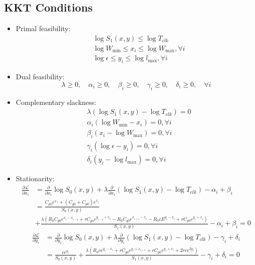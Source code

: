 \documentclass{article}
\begin{document}
\subsection{KKT Conditions}
\begin{itemize}
	\item Primal feasibility:
		\begin{equation}\nonumber
			\begin{aligned}
				&\log S_1(x,y) \leq \log T_{clk}\\
				&\log W_{\min}\leq x_i \leq \log W_{\max},\forall i\\
				&\log \epsilon \leq y_i \leq \log l_{\max},\forall i
			\end{aligned}
		\end{equation}
	\item Dual feasibility:
		\[
		\lambda \geq 0, \quad \alpha_i \geq 0, \quad \beta_i \geq 0, \quad \gamma_i \geq 0, \quad \delta_i \geq 0, \quad \forall i
		\]
	\item Complementary slackness:
		\begin{equation}\nonumber
			\begin{aligned}
				&\lambda(\log S_1(x,y) - \log T_{clk}) = 0\\
				&\alpha_i(\log W_{\min} - x_i) = 0, \forall i\\
				&\beta_i(x_i - \log W_{\max}) = 0, \forall i\\
				&\gamma_i(\log \epsilon - y_i) = 0, \forall i\\
				&\delta_i(y_i - \log l_{\max}) = 0, \forall i
			\end{aligned}
		\end{equation}
	\item Stationarity:
		\begin{equation}\nonumber
			\begin{aligned}
				\frac{\partial \mathcal{L}}{\partial x_i} &= \frac{\partial}{\partial x_i} \log S_0(x,y) + \lambda \frac{\partial}{\partial x_i} (\log S_1(x,y) - \log T_{clk}) - \alpha_i + \beta_i\\
				&=\frac{C_{p0}e^{x_1}+(C_{g0}+C_{p0})e^{x_i}}{S_0(x,y)}\\
				&+\frac{\lambda(R_0C_{g0}e^{x_i-x_{i-1}}+rC_{go}e^{y_{i-1}+x_i}-R_0C_{g0}e^{x_{i+1}-x_i}-R_0cE^{y_i-x_i}+rC_{p0}e^{y_i+x_i})}{S_1(x,y)}-\alpha_i+\beta_i=0
			\end{aligned}
		\end{equation}
		\begin{equation}
			\begin{aligned}\nonumber
				\frac{\partial \mathcal{L}}{\partial y_i} &= \frac{\partial}{\partial y_i} \log S_0(x,y) + \lambda \frac{\partial}{\partial y_i} (\log S_1(x,y) - \log T_{clk}) - \gamma_i + \delta_i\\
				&=\frac{ce^{y_i}}{S_0(x,y)}+\frac{\lambda(R_0ce^{y_i-x_i}+rC_{g0}e^{y_i+x_{i+1}}+rC_{p0}e^{y_i+x_i}+2rce^{2y_i})}{S_1(x,y)}-\gamma_i+\delta_i=0
			\end{aligned}
		\end{equation}
\end{itemize}
\end{document}
